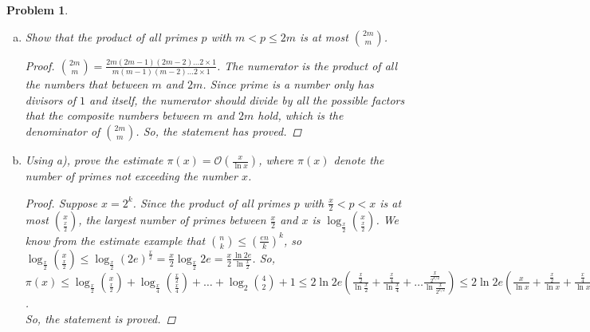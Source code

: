 \documentclass[12pt]{article}
\newtheorem{hw}{Problem}
\begin{document}
\begin{hw}
\hspace{1mm}
\begin{enumerate}[a)]
  \item Show that the product of all primes $p$ with $m<p\leq 2m$ is at most ${2m\choose m}$.
  
  \begin{proof}
    ${2m\choose m}=\frac{2m(2m-1)(2m-2)\ldots 2\times 1}{m(m-1)(m-2)\ldots 2\times 1} $. The numerator is the product of all the numbers that between $m$ and $2m$. Since prime is a number only has divisors of $1$ and itself, the numerator should divide by all the possible factors that the composite numbers between $m$ and $2m$ hold, which is the denominator of ${2m\choose m}$. So, the statement has proved.
  \end{proof}

  \item Using a), prove the estimate $\pi(x)=\mathcal{O}(\frac{x}{\ln x})$, where $\pi(x)$ denote the number of primes not exceeding the number $x$.
  
  \begin{proof}
    Suppose $x=2^k$. Since the product of all primes $p$ with $\frac{x}{2} <p<x$ is at most $x \choose \frac{x}{2}$, the largest number of primes between $\frac{x}{2}$ and $x$ is $\log_{\frac{x}{2}} {x\choose \frac{x}{2}}$. We know from the estimate example that ${n\choose k} \leq (\frac{en}{k})^k$, so $\log_{\frac{x}{2}} {x\choose \frac{x}{2}}\leq \log_{\frac{x}{2}} {(2e)^{\frac{x}{2}}}= \frac{x}{2} \log_{\frac{x}{2}} {2e}=\frac{x}{2} \frac{\ln {2e}}{\ln \frac{x}{2}}$.
    So, $\pi(x)\leq \log_{\frac{x}{2}} {x\choose \frac{x}{2}} + \log_{\frac{x}{4}} {\frac{x}{2}\choose \frac{x}{4}} + \ldots +\log_2 {4\choose 2}+1\leq 2\ln {2e} (\frac{\frac{x}{2}}{\ln \frac{x}{2}}+\frac{\frac{x}{4}}{\ln \frac{x}{4}}+\ldots \frac{\frac{x}{2^{k/2}}}{\ln \frac{x}{2^{k/2}}})\leq 2 \ln {2e}(\frac{x}{\ln x}+ \frac{\frac{x}{2}}{\ln x}+ \frac{\frac{x}{4}}{\ln x} +\ldots +\frac{\frac{x}{2^{k/2-1}}}{\ln x})\leq 2\ln {2e} \frac{2x}{\ln x}=O(\frac{x}{\ln x})$.\\
    So, the statement is proved.
  \end{proof}
  
\end{enumerate}

\end{hw}
\end{document}
